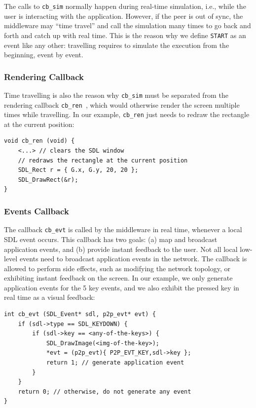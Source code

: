 \documentclass[10pt,journal,compsoc]{IEEEtran}
\newcommand{\code}[1]  {\texttt{\footnotesize{#1}}}
\begin{document}
The calls to \code{cb\_sim} normally happen during real-time simulation, i.e.,
while the user is interacting with the application.
However, if the peer is out of sync, the middleware may ``time travel'' and
call the simulation many times to go back and forth and catch up with real
time.
This is the reason why we define \code{START} as an event like any other:
travelling requires to simulate the execution from the beginning, event by
event.

\subsubsection{Rendering Callback}
\label{sec.tml.api.cb_ren}

Time travelling is also the reason why \code{cb\_sim} must be separated from
the rendering callback \code{cb\_ren}~\cite{tml.js}, which would otherwise
render the screen multiple times while travelling.
In our example, \code{cb\_ren} just needs to redraw the rectangle at the
current position:

{\footnotesize
\begin{verbatim}
void cb_ren (void) {
    <...> // clears the SDL window
    // redraws the rectangle at the current position
    SDL_Rect r = { G.x, G.y, 20, 20 };
    SDL_DrawRect(&r);
}
\end{verbatim}
}

\subsubsection{Events Callback}
\label{sec.tml.api.cb_evt}

The callback \code{cb\_evt} is called by the middleware in real time, whenever
a local SDL event occurs.
This callback has two goals:
    (a) map and broadcast application events, and
    (b) provide instant feedback to the user.
Not all local low-level events need to broadcast application events in the
network.
The callback is allowed to perform side effects, such as modifying the network
topology, or exhibiting instant feedback on the screen.
In our example, we only generate application events for the 5 key events, and
we also exhibit the pressed key in real time as a visual feedback:

{\footnotesize
\begin{verbatim}
int cb_evt (SDL_Event* sdl, p2p_evt* evt) {
    if (sdl->type == SDL_KEYDOWN) {
        if (sdl->key == <any-of-the-keys>) {
            SDL_DrawImage(<img-of-the-key>);
            *evt = (p2p_evt){ P2P_EVT_KEY,sdl->key };
            return 1; // generate application event
        }
    }
    return 0; // otherwise, do not generate any event
}
\end{verbatim}
}
\end{document}
